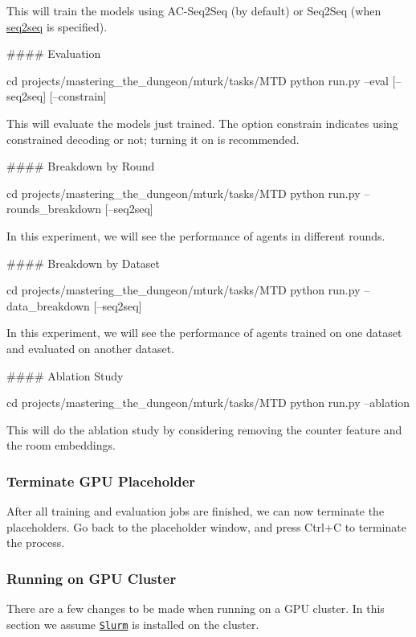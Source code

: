 This will train the models using A\+C-\/\+Seq2\+Seq (by default) or Seq2\+Seq (when \hyperlink{namespaceseq2seq}{seq2seq} is specified).

\#\#\#\# Evaluation 
\begin{DoxyCode}
cd projects/mastering\_the\_dungeon/mturk/tasks/MTD
python run.py --eval [--seq2seq] [--constrain]
\end{DoxyCode}


This will evaluate the models just trained. The option {\ttfamily constrain} indicates using constrained decoding or not; turning it on is recommended.

\#\#\#\# Breakdown by Round 
\begin{DoxyCode}
cd projects/mastering\_the\_dungeon/mturk/tasks/MTD
python run.py --rounds\_breakdown [--seq2seq]
\end{DoxyCode}


In this experiment, we will see the performance of agents in different rounds.

\#\#\#\# Breakdown by Dataset 
\begin{DoxyCode}
cd projects/mastering\_the\_dungeon/mturk/tasks/MTD
python run.py --data\_breakdown [--seq2seq]
\end{DoxyCode}


In this experiment, we will see the performance of agents trained on one dataset and evaluated on another dataset.

\#\#\#\# Ablation Study 
\begin{DoxyCode}
cd projects/mastering\_the\_dungeon/mturk/tasks/MTD
python run.py --ablation
\end{DoxyCode}


This will do the ablation study by considering removing the counter feature and the room embeddings.

\subsubsection*{Terminate G\+PU Placeholder}

After all training and evaluation jobs are finished, we can now terminate the placeholders. Go back to the placeholder window, and press {\ttfamily Ctrl+C} to terminate the process.

\subsubsection*{Running on G\+PU Cluster}

There are a few changes to be made when running on a G\+PU cluster. In this section we assume \href{https://slurm.schedmd.com/}{\tt Slurm} is installed on the cluster.

